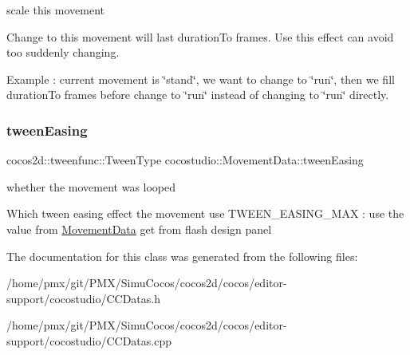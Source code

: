 scale this movement 

Change to this movement will last duration\+To frames. Use this effect can avoid too suddenly changing.

Example \+: current movement is \char`\"{}stand\char`\"{}, we want to change to \char`\"{}run\char`\"{}, then we fill duration\+To frames before change to \char`\"{}run\char`\"{} instead of changing to \char`\"{}run\char`\"{} directly. \mbox{\label{classcocostudio_1_1MovementData_a43031590e7c31eb38a39125842b27166}} 
\subsubsection{\texorpdfstring{tween\+Easing}{tweenEasing}}
{\footnotesize\ttfamily cocos2d\+::tweenfunc\+::\+Tween\+Type cocostudio\+::\+Movement\+Data\+::tween\+Easing}



whether the movement was looped 

Which tween easing effect the movement use T\+W\+E\+E\+N\+\_\+\+E\+A\+S\+I\+N\+G\+\_\+\+M\+AX \+: use the value from \hyperlink{classcocostudio_1_1MovementData}{Movement\+Data} get from flash design panel 

The documentation for this class was generated from the following files\+:\begin{DoxyCompactItemize}
\item 
/home/pmx/git/\+P\+M\+X/\+Simu\+Cocos/cocos2d/cocos/editor-\/support/cocostudio/C\+C\+Datas.\+h\item 
/home/pmx/git/\+P\+M\+X/\+Simu\+Cocos/cocos2d/cocos/editor-\/support/cocostudio/C\+C\+Datas.\+cpp\end{DoxyCompactItemize}
